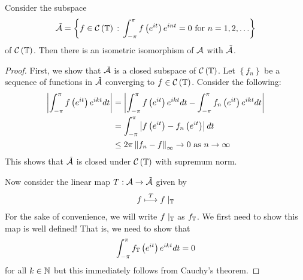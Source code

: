\begin{theorem}
    Consider the subspace
    \begin{align*}
	\tilde{{\cal A}} = \left\{ f\in {\cal C} \left( \mathbb T \right) \, : \, \int_{-\pi}^{\pi} f\left( e^{it} \right) e^{int}=0  \text{ for } n=1,2,\ldots \right\}
    \end{align*}
    of ${\cal C} \left( \mathbb T \right)$. Then there is an isometric isomorphism of ${\cal A}$ with $\tilde{{\cal A}}$.
    \label{thm:correspondence-of-disc-algebra}
\end{theorem}
\begin{proof}
    First, we show that $\tilde{{\cal A}}$ is a closed subspace of ${\cal C} \left( \mathbb T \right)$. Let $\left\{ f_{n} \right\}$ be a sequence of functions in $\tilde{{\cal A}}$ converging to $f\in {\cal C} \left( \mathbb T \right)$. Consider the following:
    \begin{align*}
	\left\lvert \int_{-\pi}^{\pi} f\left( e^{it} \right) e^{ikt} dt \right\rvert &= \left\lvert \int_{-\pi}^{\pi} f\left( e^{it} \right) e^{ikt} dt - \int_{-\pi}^{\pi} f_n\left( e^{it} \right) e^{ikt} dt \right\rvert  \\
	&= \int_{-\pi}^{\pi} \left\lvert f \left( e^{it} \right) -f_{n} \left( e^{it} \right) \right\rvert dt \\
	& \le 2\pi \left\lVert f_{n} - f \right\rVert_{\infty} \to 0 \text{ as } n\to \infty
    \end{align*}
    This shows that $\tilde{{\cal A}}$ is closed under ${\cal C} \left( \mathbb T \right)$ with supremum norm.

    Now consider the linear map $T: {\cal A} \to \tilde{{\cal A}}$ given by
    \begin{align*}
	f \stackrel{T}{\longmapsto} f\mid_{\mathbb T}
    \end{align*}
    For the sake of convenience, we will write $f\mid_{\mathbb T}$ as $f_{\mathbb T}$.
    We first need to show this map is well defined! That is, we need to show that
    \begin{equation*}
	\int_{-\pi}^{\pi} f_{\mathbb T} \left( e^{it} \right) e^{ikt} dt = 0	
    \end{equation*}
    for all $k\in \mathbb N$ but this immediately follows from Cauchy's theorem.


\end{proof}
